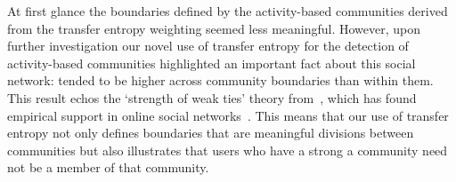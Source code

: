 

At first glance the boundaries defined by the activity-based communities derived from the transfer entropy weighting seemed less meaningful. However, upon further investigation our novel use of transfer entropy for the detection of activity-based communities highlighted an important fact about this social network: \DIFdelbegin {}\DIFdelend \DIFaddbegin {}\DIFaddend tended to be higher across community boundaries than within them. This result echos the `strength of weak ties' theory from~\cite{granovetter1973strength}, which has found empirical support in online social networks~\cite{grabowicz2012social}. This means that our use of transfer entropy not only defines boundaries that are meaningful divisions between communities but also illustrates that users who have a strong \DIFdelbegin {}\DIFdelend \DIFaddbegin {}\DIFaddend a community need not be a member of that community. 


